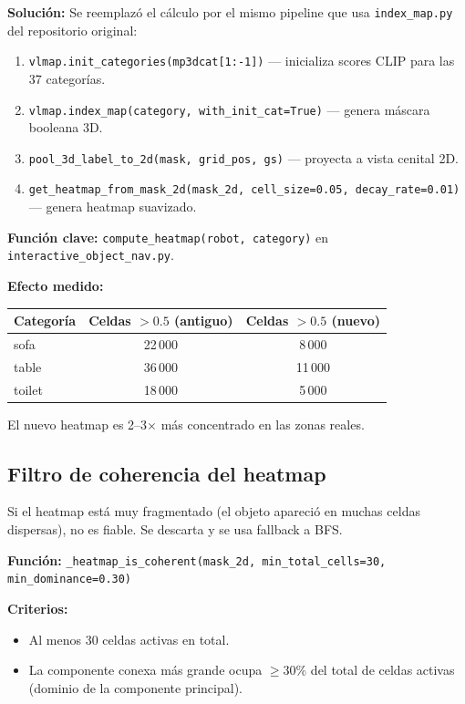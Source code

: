 \documentclass[11pt,a4paper]{article}
\begin{document}
\textbf{Solución:} Se reemplazó el cálculo por el mismo pipeline que usa
\texttt{index\_map.py} del repositorio original:
\begin{enumerate}
  \item \texttt{vlmap.init\_categories(mp3dcat[1:-1])} --- inicializa scores CLIP para las 37 categorías.
  \item \texttt{vlmap.index\_map(category, with\_init\_cat=True)} --- genera máscara booleana 3D.
  \item \texttt{pool\_3d\_label\_to\_2d(mask, grid\_pos, gs)} --- proyecta a vista cenital 2D.
  \item \texttt{get\_heatmap\_from\_mask\_2d(mask\_2d, cell\_size=0.05, decay\_rate=0.01)} --- genera heatmap suavizado.
\end{enumerate}

\textbf{Función clave:} \texttt{compute\_heatmap(robot, category)} en
\texttt{interactive\_object\_nav.py}.

\textbf{Efecto medido:}
\begin{center}
\begin{tabular}{lcc}
\toprule
Categoría & Celdas $>0.5$ (antiguo) & Celdas $>0.5$ (nuevo) \\
\midrule
sofa       & 22\,000 & 8\,000  \\
table      & 36\,000 & 11\,000 \\
toilet     & 18\,000 & 5\,000  \\
\bottomrule
\end{tabular}
\end{center}
El nuevo heatmap es 2--3$\times$ más concentrado en las zonas reales.

\subsection{Filtro de coherencia del heatmap}

Si el heatmap está muy fragmentado (el objeto apareció en muchas celdas
dispersas), no es fiable. Se descarta y se usa fallback a BFS.

\textbf{Función:} \texttt{\_heatmap\_is\_coherent(mask\_2d, min\_total\_cells=30,
min\_dominance=0.30)}

\textbf{Criterios:}
\begin{itemize}
  \item Al menos 30 celdas activas en total.
  \item La componente conexa más grande ocupa $\geq 30\%$ del total de celdas
        activas (dominio de la componente principal).
\end{itemize}
\end{document}

